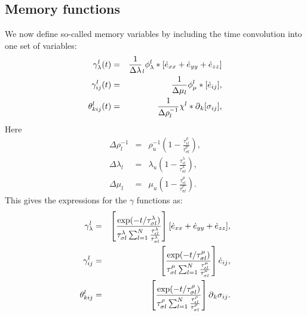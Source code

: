 \documentclass[11pt]{article}
\begin{document}
\subsection{Memory functions} 
We now define so-called memory variables by including the time 
convolution into one set of variables:
\begin{eqnarray}
 \gamma^l_{\lambda}(t) 
  & =& \frac{1}{\Delta\lambda}_l \phi^l_{\lambda}
       *[\dot{e}_{xx}+\dot{e}_{yy}+\dot{e}_{zz}]                  \nonumber \\ 
 \gamma^l_{ij}(t) 
  & =& \frac{1}{\Delta\mu_l}\phi^l_{\mu}
       *[\dot{e}_{ij}],                                           \nonumber \\
 \theta^l_{kij}(t) 
  & =& \frac{1}{\Delta\rho^{-1}_l}\chi^l*\mbox{$\partial$}_k[\sigma_{ij}],  
                                                \label{eq:gamma-l}
\end{eqnarray}
Here 
\begin{eqnarray}
  \Delta\rho^{-1}_l 
     & = & \rho^{-1}_u\left(1-\frac{\tau^{\rho}_{\epsilon l}}
                                   {\tau^{\rho}_{\sigma l}}\right),\nonumber \\
 \Delta\lambda_l                              
     & = & \lambda_u\left(1-\frac{\tau^{\lambda}_{\epsilon l}}
                              {\tau^{\lambda}_{\sigma l}}\right),  \nonumber \\
 \Delta\mu_l                              
     & = & \mu_u\left(1-\frac{\tau^{\mu}_{\epsilon l}}
                              {\tau^{\rho}_{\sigma l}}\right).    
\end{eqnarray}
This gives the expressions for the $\gamma$ functions as:
\begin{eqnarray}
 \gamma^l_{\lambda}    
    & = & \left[\frac{\exp(-t/\tau^{\lambda}_{\sigma l})}
                     {\tau^{\lambda}_{\sigma l}
                     \sum_{l=1}^N \frac{\tau^{\lambda}_{\epsilon l}}
                     {\tau^{\lambda}_{\sigma l}}}\right] 
                     [\dot{e}_{xx}+\dot{e}_{yy}+\dot{e}_{zz}],   \nonumber  \\
 \gamma^l_{ij}    
   & = & \left[\frac{\exp(-t/\tau^{\mu}_{\sigma l})}
                     {\tau^{\mu}_{\sigma l}
                     \sum_{l=1}^N \frac{\tau^{\mu}_{\epsilon l}}
                     {\tau^{\mu}_{\sigma l}}}\right] 
                     \dot{e}_{ij},                                \nonumber \\
 \theta^l_{kij}    
   & = & \left[\frac{\exp(-t/\tau^{\rho}_{\sigma l})}
                    {\tau^{\rho}_{\sigma l}
                    \sum_{l=1}^N \frac{\tau^{\rho}_{\epsilon l}}
                    {\tau^{\rho}_{\sigma l}}}\right] 
                    \mbox{$\partial$}_k \sigma_{ij}.
\end{eqnarray}
\end{document}
